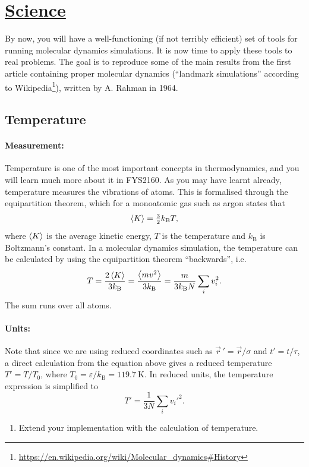\documentclass[11pt,british,a4paper]{report}
\begin{document}
\section{\underline{Science}}
By now, you will have a well-functioning (if not terribly efficient) set of tools for running molecular dynamics simulations. It is now time to apply these tools to real problems. The goal is to reproduce some of the main results from the first article containing proper molecular dynamics (``landmark simulations'' according to Wikipedia\footnote{\url{https://en.wikipedia.org/wiki/Molecular_dynamics\#History}}), written by A. Rahman in 1964\cite{Rahman_1964}.

\subsection{Temperature}
\paragraph{Measurement:} Temperature is one of the most important concepts in thermodynamics, and you will learn much more about it in FYS2160. As you may have learnt already, temperature measures the vibrations of atoms. This is formalised through the equipartition theorem, which for a monoatomic gas such as argon states that
\[
    \ev{K} = \tfrac{3}{2}k_\mathrm{B}T,
\]
where \(\ev{K}\) is the average kinetic energy, \(T\) is the temperature and \(k_\mathrm{B}\) is Boltzmann's constant. In a molecular dynamics simulation, the temperature can be calculated by using the equipartition theorem ``backwards'', i.e.
\[
    T = \frac{2\ev{K}}{3k_\mathrm{B}} = \frac{\ev{mv^2}}{3k_\mathrm{B}} = \frac{m}{3k_\mathrm{B}N}\sum_i v_i^2.
\]
The sum runs over all atoms.

\paragraph{Units:} Note that since we are using reduced coordinates such as \(\vec{r}\,'=\vec{r}/\sigma\) and \(t'=t/\tau\), a direct calculation from the equation above gives a reduced temperature \(T'=T/T_0\), where \(T_0 = \varepsilon/k_\mathrm{B}=\SI{119.7}{\kelvin}\). In reduced units, the temperature expression is simplified to
\[
    T' = \frac{1}{3N}\sum_i v_i'^2.
\]
\begin{enumerate}[label=\roman*.]
    \item Extend your implementation with the calculation of temperature.
\end{enumerate}
\end{document}
